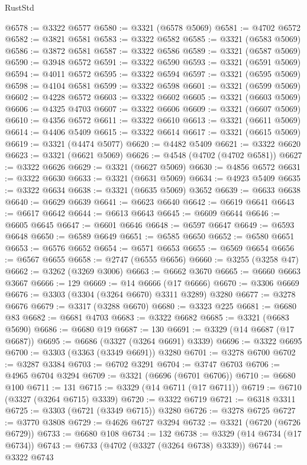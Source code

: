 \begin{lexlean}{RustStd}
\begin{coremodule}
{\begin{coremodule}
{{{{{{{{{{{{{{{{{{{{{{{{{{{{{{{{{@6578 := @3322 @6577
@6580 := @3321 (@6578 @5069)
@6581 := @4702 @6572
@6582 := @3821 @6581
@6583 := @3322 @6582
@6585 := @3321 (@6583 @5069)
@6586 := @3872 @6581
@6587 := @3322 @6586
@6589 := @3321 (@6587 @5069)
@6590 := @3948 @6572
@6591 := @3322 @6590
@6593 := @3321 (@6591 @5069)
@6594 := @4011 @6572
@6595 := @3322 @6594
@6597 := @3321 (@6595 @5069)
@6598 := @4104 @6581
@6599 := @3322 @6598
@6601 := @3321 (@6599 @5069)
@6602 := @4228 @6572
@6603 := @3322 @6602
@6605 := @3321 (@6603 @5069)
@6606 := @4325 @4703
@6607 := @3322 @6606
@6609 := @3321 (@6607 @5069)
@6610 := @4356 @6572
@6611 := @3322 @6610
@6613 := @3321 (@6611 @5069)
@6614 := @4406 @5409
@6615 := @3322 @6614
@6617 := @3321 (@6615 @5069)
@6619 := @3321 (@4474 @5077)
@6620 := @4482 @5409
@6621 := @3322 @6620
@6623 := @3321 (@6621 @5069)
@6626 := @4548 (@4702 (@4702 @6581))
@6627 := @3322 @6626
@6629 := @3321 (@6627 @5069)
@6630 := @4856 @6572
@6631 := @3322 @6630
@6633 := @3321 (@6631 @5069)
@6634 := @4923 @5409
@6635 := @3322 @6634
@6638 := @3321 (@6635 @5069) @3652
@6639 := @6633 @6638
@6640 := @6629 @6639
@6641 := @6623 @6640
@6642 := @6619 @6641
@6643 := @6617 @6642
@6644 := @6613 @6643
@6645 := @6609 @6644
@6646 := @6605 @6645
@6647 := @6601 @6646
@6648 := @6597 @6647
@6649 := @6593 @6648
@6650 := @6589 @6649
@6651 := @6585 @6650
@6652 := @6580 @6651
@6653 := @6576 @6652
@6654 := @6571 @6653
@6655 := @6569 @6654
@6656 := @6567 @6655
@6658 := @2747 (@6555 @6656)
@6660 := @3255 (@3258 @47)
@6662 := @3262 (@3269 @3006)
@6663 := @6662 @3670
@6665 := @6660 @6663 @3667
@6666 := 129
@6669 := @14 @6666 (@17 @6666)
@6670 := @3306 @6669
@6676 := @3303 (@3304 (@3264 @6670) @3311 @3289) @3280
@6677 := @3278 @6676
@6679 := @3317 (@3288 @6670)
@6680 := @3323 @225
@6681 := @6680 @83
@6682 := @6681 @4703
@6683 := @3322 @6682
@6685 := @3321 (@6683 @5690)
@6686 := @6680 @19
@6687 := 130
@6691 := @3329 (@14 @6687 (@17 @6687))
@6695 := @6686 (@3327 (@3264 @6691) @3339)
@6696 := @3322 @6695
@6700 := @3303 (@3363 (@3349 @6691)) @3280
@6701 := @3278 @6700
@6702 := @3287 @3384
@6703 := @6702 @3291
@6704 := @3747 @6703
@6706 := @4965 @6704 @3294
@6709 := @3321 (@6696 (@6701 @6706))
@6710 := @6680 @100
@6711 := 131
@6715 := @3329 (@14 @6711 (@17 @6711))
@6719 := @6710 (@3327 (@3264 @6715) @3339)
@6720 := @3322 @6719
@6721 := @6318 @3311
@6725 := @3303 (@6721 (@3349 @6715)) @3280
@6726 := @3278 @6725
@6727 := @3770 @3808
@6729 := @4626 @6727 @3294
@6732 := @3321 (@6720 (@6726 @6729))
@6733 := @6680 @108
@6734 := 132
@6738 := @3329 (@14 @6734 (@17 @6734))
@6743 := @6733 (@4702 (@3327 (@3264 @6738) @3339))
@6744 := @3322 @6743
}}}}}}}}}}}}}}}}}}}}}}}}}}}}}}}}}
\end{coremodule}}
\end{coremodule}
\end{lexlean}
